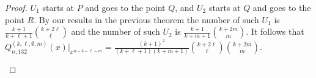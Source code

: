 \documentclass[
final,nomarks
]{dmtcs-episciences}
\newcommand{\Qmmn}[2]{Q_{#2,132}^{(#1)}(x)}
\begin{document}
\begin{proof}
	\begin{math}U_1\end{math} starts at \begin{math}P\end{math} and goes to the point 
	\begin{math}Q\end{math}, and \begin{math}U_2\end{math} starts at \begin{math}Q\end{math} and goes to the point \begin{math}R\end{math}.  By our results in the previous theorem 
	the number of such \begin{math}U_1\end{math} is \begin{math}\frac{k+1}{k+\ell+1}\binom{k+2\ell}{\ell}\end{math} and the number of 
	such \begin{math}U_2\end{math} is \begin{math}\frac{k+1}{k+m+1} \binom{k+2m}{m}\end{math}. It follows that 
	\begin{math}\Qmmn{k,\ell,\emptyset,m}{n}\big\vert_{x^{n-k-\ell-m}}=
	\frac{(k+1)^2}{(k+\ell+1)(k+m+1)}\binom{k+2\ell}{\ell}\binom{k+2m}{m}\end{math}.
	\begin{figure}[ht]
		\centering
		\vspace{-1mm}
\end{figure}
\end{proof}
\end{document}
